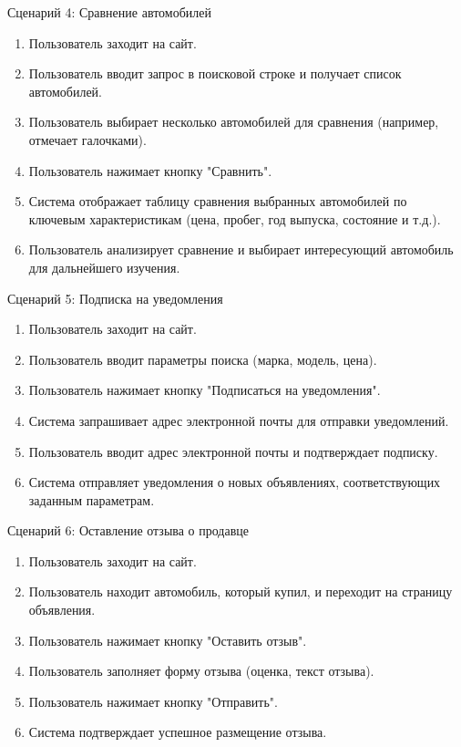Сценарий 4: Сравнение автомобилей

\begin{enumerate}
    \item Пользователь заходит на сайт.
    \item Пользователь вводит запрос в поисковой строке и получает список автомобилей.
    \item Пользователь выбирает несколько автомобилей для сравнения (например, отмечает галочками).
    \item Пользователь нажимает кнопку "Сравнить".
    \item Система отображает таблицу сравнения выбранных автомобилей по ключевым характеристикам (цена, пробег, год выпуска, состояние и т.д.).
    \item Пользователь анализирует сравнение и выбирает интересующий автомобиль для дальнейшего изучения.
\end{enumerate}
\bigskip

Сценарий 5: Подписка на уведомления

\begin{enumerate}
    \item Пользователь заходит на сайт.
    \item Пользователь вводит параметры поиска (марка, модель, цена).
    \item Пользователь нажимает кнопку "Подписаться на уведомления".
    \item Система запрашивает адрес электронной почты для отправки уведомлений.
    \item Пользователь вводит адрес электронной почты и подтверждает подписку.
    \item Система отправляет уведомления о новых объявлениях, соответствующих заданным параметрам.
\end{enumerate}
\bigskip

Сценарий 6: Оставление отзыва о продавце

\begin{enumerate}
    \item Пользователь заходит на сайт.
    \item Пользователь находит автомобиль, который купил, и переходит на страницу объявления.
    \item Пользователь нажимает кнопку "Оставить отзыв".
    \item Пользователь заполняет форму отзыва (оценка, текст отзыва).
    \item Пользователь нажимает кнопку "Отправить".
    \item Система подтверждает успешное размещение отзыва.
\end{enumerate}
\bigskip

